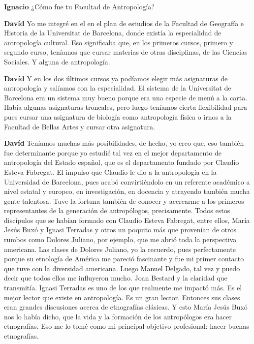 \documentclass[
  spanish,
  11pt,
  a4paper,
]{scrbook}
\newenvironment{transcripcion}{
    \begin{list}{}{
        \setlength{\leftmargin}{1.5em}  %
        \setlength{\rightmargin}{0em}
        \setlength{\itemsep}{0.2em}     %
        \setlength{\parsep}{0.0em}
        \setlength{\listparindent}{0pt}
    }
}{
    \end{list}
}
\newcommand{\personaje}[1]{\textbf{#1}\quad}
\begin{document}
\begin{transcripcion}
\item \personaje{Ignacio} ¿Cómo fue tu Facultad de Antropología?

\item \personaje{Davíd} Yo me integré en el en el plan de estudios de la Facultad de Geografía e Historia de la Universitat de Barcelona, donde existía la especialidad de antropología cultural. Eso significaba que, en los primeros cursos, primero y segundo curso, teníamos que cursar materias de otras disciplinas, de las Ciencias Sociales. Y alguna de antropología.

\item \personaje{Davíd} Y en los dos últimos cursos ya podíamos elegir más asignaturas de antropología y salíamos con la especialidad. El sistema de la Universitat de Barcelona era un sistema muy bueno porque era una especie de menú a la carta. Había algunas asignaturas troncales, pero luego teníamos cierta flexibilidad para pues cursar una asignatura de biología como antropología física o irnos a la Facultad de Bellas Artes y cursar otra asignatura.

\item \personaje{Davíd} Teníamos muchas más posibilidades, de hecho, yo creo que, eso también fue determinante porque yo estudié tal vez en el mejor departamento de antropología del Estado español, que es el departamento fundado por Claudio Esteva Fabregat. El impulso que Claudio le dio a la antropología en la Universidad de Barcelona, pues acabó convirtiéndolo en un referente académico a nivel estatal y europeo, en investigación, en docencia y atrayendo también mucha gente talentosa. Tuve la fortuna también de conocer y acercarme a los primeros representantes de la generación de antropólogos, precisamente. Todos estos discípulos que se habían formado con Claudio Esteva Fabregat, entre ellos, María Jesús Buxó y Ignasi Terradas y otros un poquito más que provenían de otros rumbos como Dolores Juliano, por ejemplo, que me abrió toda la perspectiva americana. Las clases de Dolores Juliano, yo la recuerdo, pues perfectamente porque su etnología de América me pareció fascinante y fue mi primer contacto que tuve con la diversidad americana. Luego Manuel Delgado, tal vez y puedo decir que todos ellos me influyeron mucho. Joan Bestard y la claridad que transmitía. Ignasi Terradas es uno de los que realmente me impactó más. Es el mejor lector que existe en antropología. Es un gran lector. Entonces sus clases eran grandes discusiones acerca de etnografías clásicas. Y esto María Jesús Buxó nos lo había dicho, que la vida y la formación de los antropólogos era hacer etnografías. Eso me lo tomé como mi principal objetivo profesional: hacer buenas etnografías.


\end{transcripcion}
\end{document}
